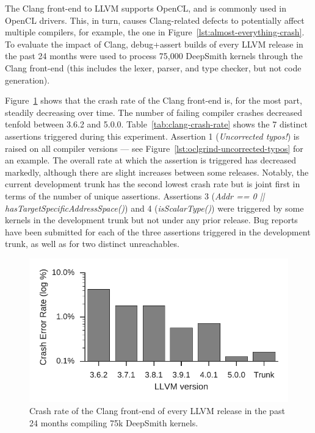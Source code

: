 The Clang front-end to LLVM supports OpenCL, and is commonly used in OpenCL drivers. This, in turn, causes Clang-related defects to potentially affect multiple compilers, for example, the one in Figure~\ref{lst:almost-everything-crash}. To evaluate the impact of Clang, debug+assert builds of every LLVM release in the past 24 months were used to process 75,000 DeepSmith kernels through the Clang front-end (this includes the lexer, parser, and type checker, but not code generation).

Figure~\ref{fig:clang-clash-rate} shows that the crash rate of the Clang front-end is, for the most part, steadily decreasing over time. The number of failing compiler crashes decreased tenfold between 3.6.2 and 5.0.0. Table~\ref{tab:clang-crash-rate} shows the 7 distinct assertions triggered during this experiment. Assertion 1 (\emph{Uncorrected typos!}) is raised on all compiler versions --- see Figure~\ref{lst:oclgrind-uncorrected-typos} for an example. The overall rate at which the assertion is triggered has decreased markedly, although there are slight increases between some releases. Notably, the current development trunk has the second lowest crash rate but is joint first in terms of the number of unique assertions. Assertions 3 (\emph{Addr == 0 || hasTargetSpecificAddressSpace()}) and 4 (\emph{isScalarType()}) were triggered by some kernels in the development trunk but not under any prior release. Bug reports have been submitted for each of the three assertions triggered in the development trunk, as well as for two distinct unreachables.

\begin{figure}
  \centering %
  \includegraphics[width=.85\columnwidth]{img/clang-crashes}%
  \caption[Crash rate of the Clang front-end]{%
    Crash rate of the Clang front-end of every LLVM release in the past 24 months compiling 75k DeepSmith kernels.%
  }%
  \label{fig:clang-clash-rate}
\end{figure}

